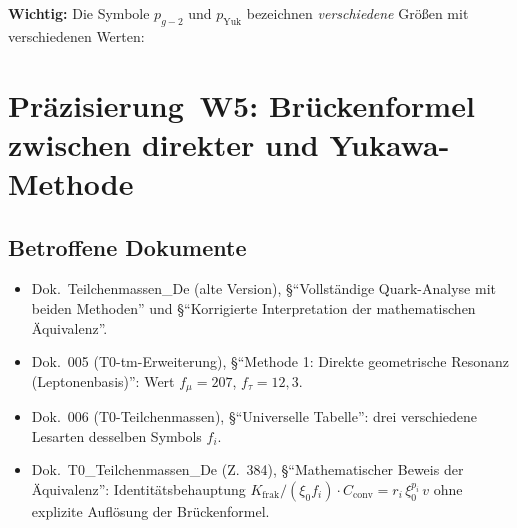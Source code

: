 \textbf{Wichtig:} Die Symbole $p_{g\!-\!2}$ und $p_{\text{Yuk}}$
bezeichnen \emph{verschiedene} Größen mit verschiedenen Werten:

\begin{center}
{\footnotesize
{}
}
\end{center}

\section{\texorpdfstring{Präzisierung~W5: Brückenformel zwischen direkter und Yukawa-Methode}{Praezisierung W5: Brueckenformel zwischen direkter und Yukawa-Methode}}

\subsection*{Betroffene Dokumente}

\begin{itemize}
  \item Dok.~Teilchenmassen\_De (alte Version), §\enquote{Vollständige
        Quark-Analyse mit beiden Methoden} und
        §\enquote{Korrigierte Interpretation der mathematischen
        Äquivalenz}.
  \item Dok.~005 (T0-tm-Erweiterung), §\enquote{Methode 1: Direkte
        geometrische Resonanz (Leptonenbasis)}: Wert $f_\mu = 207$,
        $f_\tau = 12{,}3$.
  \item Dok.~006 (T0-Teilchenmassen), §\enquote{Universelle
        Tabelle}: drei verschiedene Lesarten desselben Symbols $f_i$.
  \item Dok.~T0\_Teilchenmassen\_De (Z.~384), §\enquote{Mathematischer
        Beweis der Äquivalenz}: Identitätsbehauptung
        $K_{\text{frak}}/(\xi_0 f_i)\cdot C_{\text{conv}}
        = r_i\,\xi_0^{p_i}\,v$
        ohne explizite Auflösung der Brückenformel.
\end{itemize}

